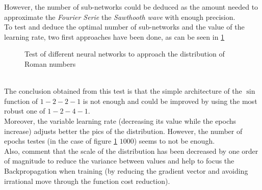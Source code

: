\documentclass[a4paper, 11pt]{article}
\begin{document}
However, the number of sub-networks could be deduced as the amount needed to approximate the \textit{Fourier Serie} the \textit{Sawthooth wave} with enough precision.\\
To test and deduce the optimal number of sub-networks and the value of the learning rate, two first approaches have been done, as can be seen in \ref{first-approach}
\begin{figure}[h]
    \centering
    \hspace{1em}
    \caption{Test of different neural networks to approach the distribution of Roman numbers}
    \label{first-approach}
\end{figure}\\
The conclusion obtained from this test is that the simple architecture of the $\sin$ function of $1-2-2-1$ is not enough and could be improved by using the most robust one of $1-2-4-1$.\\
Moreover, the variable learning rate (decreasing its value while the epochs increase) adjusts better the pics of the distribution. However, the number of epochs testes (in the case of figure \ref{first-approach} $1000$) seems to not be enough.\\
Also, comment that the scale of the distribution has been decreased by one order of magnitude to reduce the variance between values and help to focus the Backpropagation when training (by reducing the gradient vector and avoiding irrational move through the function cost reduction).
\end{document}
